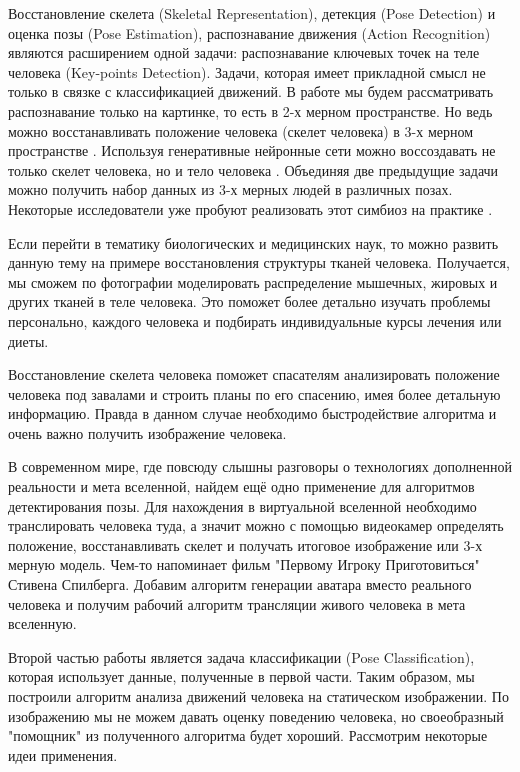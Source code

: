 Восстановление скелета (Skeletal Representation), детекция (Pose De\-te\-ction) и оценка позы (Pose Estimation), распознавание движения (Action Recognition) являются расширением одной задачи: распознавание ключевых точек на теле человека (Key-points Detection). Задачи, которая имеет прикладной смысл не только в связке с классификацией движений. В работе мы будем рассматривать распознавание только на картинке, то есть в 2-х мерном пространстве. Но ведь можно восстанавливать положение человека (скелет человека) в 3-х мерном пространстве \cite{WANG2021103225, 8100086}. Используя генеративные нейронные сети можно воссоздавать не только скелет человека, но и тело человека \cite{Zhang_2017_CVPR}. Объединяя две предыдущие задачи можно получить набор данных из 3-х мерных людей в различных позах. Некоторые исследователи уже пробуют реализовать этот симбиоз на практике \cite{varol17_surreal}.

Если перейти в тематику биологических и медицинских наук, то можно развить данную тему на примере восстановления структуры тканей человека. Получается, мы сможем по фотографии моделировать распределение мышечных, жировых и других тканей в теле человека. Это поможет более детально изучать проблемы персонально, каждого человека и подбирать индивидуальные курсы лечения или диеты.

Восстановление скелета человека поможет спасателям анализировать положение человека под завалами и строить планы по его спасению, имея более детальную информацию. Правда в данном случае необходимо быстродействие алгоритма и очень важно получить изображение человека.

В современном мире, где повсюду слышны разговоры о технологиях дополненной реальности и мета вселенной, найдем ещё одно применение для алгоритмов детектирования позы. Для нахождения в виртуальной вселенной необходимо транслировать человека туда, а значит можно с помощью видеокамер определять положение, восстанавливать скелет и получать итоговое изображение или 3-х мерную модель. Чем-то напоминает фильм "Первому Игроку Приготовиться"{} Стивена Спилберга. Добавим алгоритм генерации аватара вместо реального человека и получим рабочий алгоритм трансляции живого человека в мета вселенную.

\hfill \break
Второй частью работы является задача классификации (Pose Classi\-fi\-ca\-tion), которая использует данные, полученные в первой части. Таким образом, мы построили алгоритм анализа движений человека на статическом изображении. По изображению мы не можем давать оценку поведению человека, но своеобразный "помощник"{} из полученного алгоритма будет хороший. Рассмотрим некоторые идеи применения.

